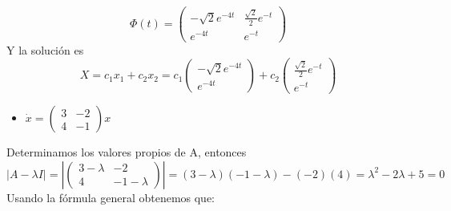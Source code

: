 \begin{equation*}
    \Phi(t)= \begin{pmatrix}
-\sqrt{2}e^{-4t}& \frac{\sqrt{2}}{2}e^{-t} \\
e^{-4t} & e^{-t}
\end{pmatrix}
\end{equation*}
Y la solución es 
\begin{equation*}
    X=c_{1}x_{1} + c_{2}x_{2} =c_{1}\begin{pmatrix}
-\sqrt{2}e^{-4t} \\
e^{-4t}
\end{pmatrix} + c_{2} \begin{pmatrix}
    \frac{\sqrt{2}}{2}e^{-t}  \\
    e^{-t}
    \end{pmatrix}
\end{equation*}
\newpage
\begin{itemize}
    \item $\dot x = 
\begin{pmatrix}
3 & -2 \\
4 & -1
\end{pmatrix}x$
\end{itemize}
Determinamos los valores propios de A, entonces
\begin{equation*}
    |A - \lambda I| = 
|\begin{pmatrix}
3 - \lambda & -2\\
4 & -1 - \lambda
\end{pmatrix}| 
= (3 - \lambda)(-1 - \lambda)-(-2)(4)= \lambda^{2}-2\lambda+5 = 0
\end{equation*}
Usando la fórmula general obtenemos que:

